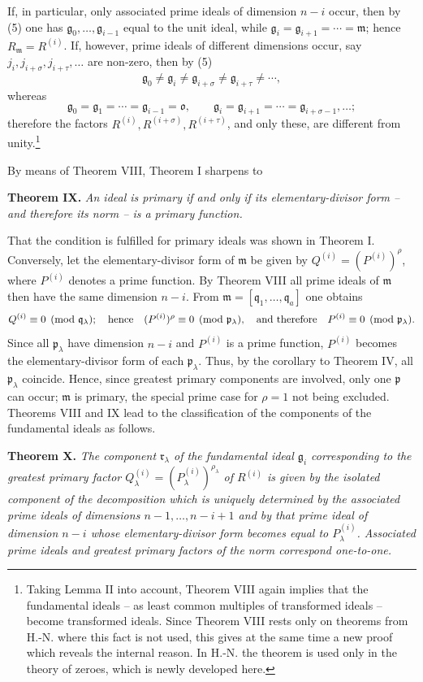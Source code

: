 \documentclass[11pt]{article}
\providecommand{\frakm}{\mathfrak m}
\providecommand{\frakp}{\mathfrak p}
\providecommand{\frakq}{\mathfrak q}
\providecommand{\frakr}{\mathfrak r}
\providecommand{\frakg}{\mathfrak g}
\providecommand{\frako}{\mathfrak o}
\begin{document}
If, in particular, only associated prime ideals of dimension $n-i$ occur, then by (5) one has $\frakg_0,\ldots,\frakg_{i-1}$ equal to the unit ideal, while $\frakg_i=\frakg_{i+1}=\cdots=\frakm$; hence $R_\frakm=R^{(i)}$. If, however, prime ideals of different dimensions occur, say $j_i,j_{i+\sigma},j_{i+\tau},\ldots$ are non-zero, then by (5)
\[
 \frakg_0\ne \frakg_i\ne \frakg_{i+\sigma}\ne \frakg_{i+\tau}\ne\cdots,
\]
whereas
\[
 \frakg_0=\frakg_1=\cdots=\frakg_{i-1}=\frako,
 \qquad
 \frakg_i=\frakg_{i+1}=\cdots=\frakg_{i+\sigma-1},\ldots;
\]
therefore the factors $R^{(i)},R^{(i+\sigma)},R^{(i+\tau)}$, and only these, are different from unity.\footnote{Taking Lemma II into account, Theorem VIII again implies that the fundamental ideals -- as least common multiples of transformed ideals -- become transformed ideals. Since Theorem VIII rests only on theorems from H.-N. where this fact is not used, this gives at the same time a new proof which reveals the internal reason. In H.-N. the theorem is used only in the theory of zeroes, which is newly developed here.}

By means of Theorem VIII, Theorem I sharpens to

\textbf{Theorem IX.} \emph{An ideal is primary if and only if its elementary-divisor form -- and therefore its norm -- is a primary function.}

That the condition is fulfilled for primary ideals was shown in Theorem I. Conversely, let the elementary-divisor form of $\frakm$ be given by $Q^{(i)}=(P^{(i)})^\rho$, where $P^{(i)}$ denotes a prime function. By Theorem VIII all prime ideals of $\frakm$ then have the same dimension $n-i$. From $\frakm=[\frakq_1,\ldots,\frakq_a]$ one obtains
\[
 Q^{(i)}\equiv0\pmod{\frakq_\lambda};
 \quad\hbox{hence}\quad
 (P^{(i)})^\rho\equiv0\pmod{\frakp_\lambda},
 \quad\hbox{and therefore}\quad P^{(i)}\equiv0\pmod{\frakp_\lambda}.
\]
Since all $\frakp_\lambda$ have dimension $n-i$ and $P^{(i)}$ is a prime function, $P^{(i)}$ becomes the elementary-divisor form of each $\frakp_\lambda$. Thus, by the corollary to Theorem IV, all $\frakp_\lambda$ coincide. Hence, since greatest primary components are involved, only one $\frakp$ can occur; $\frakm$ is primary, the special prime case for $\rho=1$ not being excluded. Theorems VIII and IX lead to the classification of the components of the fundamental ideals as follows.

\textbf{Theorem X.} \emph{The component $\frakr_\lambda$ of the fundamental ideal $\frakg_i$ corresponding to the greatest primary factor $Q_\lambda^{(i)}=(P_\lambda^{(i)})^{\rho_\lambda}$ of $R^{(i)}$ is given by the isolated component of the decomposition which is uniquely determined by the associated prime ideals of dimensions $n-1,\ldots,n-i+1$ and by that prime ideal of dimension $n-i$ whose elementary-divisor form becomes equal to $P_\lambda^{(i)}$. Associated prime ideals and greatest primary factors of the norm correspond one-to-one.}
\end{document}
